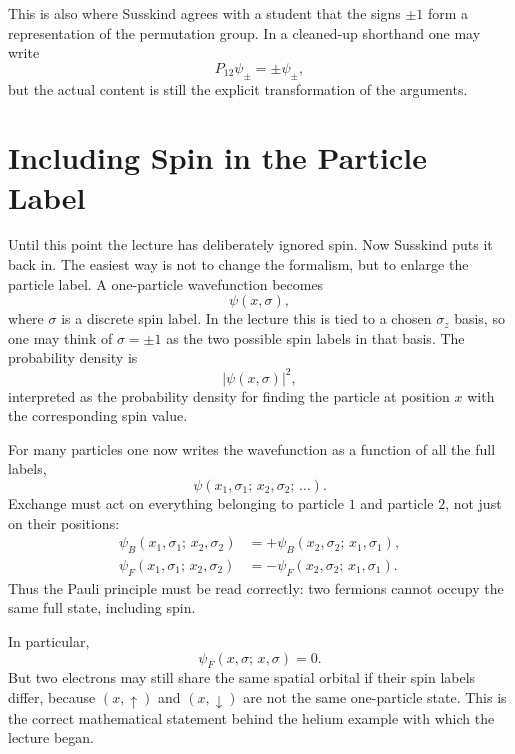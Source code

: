 This is also where Susskind agrees with a student that the signs \(\pm 1\) form a representation of the permutation group. In a cleaned-up shorthand one may write
\begin{equation}
P_{12}\psi_{\pm}=\pm \psi_{\pm},
\end{equation}
but the actual content is still the explicit transformation of the arguments.

\section{Including Spin in the Particle Label}

Until this point the lecture has deliberately ignored spin. Now Susskind puts it back in. The easiest way is not to change the formalism, but to enlarge the particle label. A one-particle wavefunction becomes
\begin{equation}
\psi(x,\sigma),
\end{equation}
where \(\sigma\) is a discrete spin label. In the lecture this is tied to a chosen \(\sigma_z\) basis, so one may think of \(\sigma=\pm 1\) as the two possible spin labels in that basis. The probability density is
\begin{equation}
|\psi(x,\sigma)|^2,
\end{equation}
interpreted as the probability density for finding the particle at position \(x\) with the corresponding spin value.

For many particles one now writes the wavefunction as a function of all the full labels,
\begin{equation}
\psi(x_1,\sigma_1;\,x_2,\sigma_2;\,\ldots).
\end{equation}
Exchange must act on everything belonging to particle \(1\) and particle \(2\), not just on their positions:
\begin{align}
\psi_B(x_1,\sigma_1;\,x_2,\sigma_2)
&=+\psi_B(x_2,\sigma_2;\,x_1,\sigma_1), \\
\psi_F(x_1,\sigma_1;\,x_2,\sigma_2)
&=-\psi_F(x_2,\sigma_2;\,x_1,\sigma_1).
\end{align}
Thus the Pauli principle must be read correctly: two fermions cannot occupy the same full state, including spin.

In particular,
\begin{equation}
\psi_F(x,\sigma;\,x,\sigma)=0.
\end{equation}
But two electrons may still share the same spatial orbital if their spin labels differ, because \((x,\uparrow)\) and \((x,\downarrow)\) are not the same one-particle state. This is the correct mathematical statement behind the helium example with which the lecture began.

